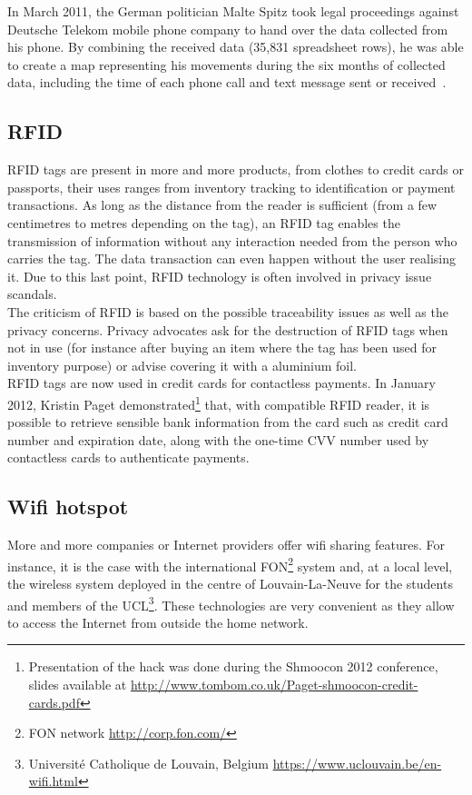 In March 2011, the German politician Malte Spitz took legal proceedings against Deutsche Telekom mobile phone company to hand over the data collected from his phone.
By combining the received data (35,831 spreadsheet rows), he was able to create a map representing his movements during the six months of collected data, including the time of each phone call and text message sent or received~\cite{german-phone-tracking}.

\subsection*{RFID}

RFID tags are present in more and more products, from clothes to credit cards or passports, their uses ranges from inventory tracking to identification or payment transactions.
As long as the distance from the reader is sufficient (from a few centimetres to metres depending on the tag), an RFID tag enables the transmission of information without any interaction needed from the person who carries the tag.
The data transaction can even happen without the user realising it.
Due to this last point, RFID technology is often involved in privacy issue scandals.\\

The criticism of RFID is based on the possible traceability issues as well as the privacy concerns.
Privacy advocates ask for the destruction of RFID tags when not in use (for instance after buying an item where the tag has been used for inventory purpose) or advise covering it with a aluminium foil.\\

RFID tags are now used in credit cards for contactless payments.
In January 2012, Kristin Paget demonstrated\footnote{Presentation of the hack was done during the Shmoocon 2012 conference, slides available at \url{http://www.tombom.co.uk/Paget-shmoocon-credit-cards.pdf}} that, with compatible RFID reader, it is possible to retrieve sensible bank information from the card such as credit card number and expiration date, along with the one-time CVV number used by contactless cards to authenticate payments.

\subsection*{Wifi hotspot}

More and more companies or Internet providers offer wifi sharing features.
For instance, it is the case with the international FON\footnote{FON network \url{http://corp.fon.com/}} system and, at a local level, the wireless system deployed in the centre of Louvain-La-Neuve for the students and members of the UCL\footnote{Université Catholique de Louvain, Belgium \url{https://www.uclouvain.be/en-wifi.html}}.
These technologies are very convenient as they allow to access the Internet from outside the home network.\\


